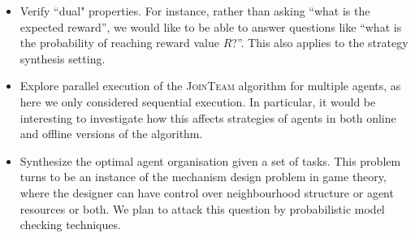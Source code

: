 \documentclass{llncs}
\begin{document}
\begin{itemize}
\item Verify ``dual" properties. For instance, rather than asking ``what is the expected reward'', we would like to be able to answer questions like ``what is the probability of reaching reward value $R$?''. This also applies to the strategy synthesis setting.

\item Explore parallel execution of the \textsc{JoinTeam} algorithm for multiple agents, as here we only considered sequential execution. %
    In particular, it would be interesting to investigate how this affects strategies of agents in both online and offline versions of the algorithm. %


 \item Synthesize the optimal agent organisation given a set of tasks. %
       This problem turns to be an instance of the mechanism design problem in game theory, where the designer can have control over neighbourhood structure or agent resources or both. We plan to attack this question by probabilistic model checking techniques.
\end{itemize}




\appendix
\end{document}
